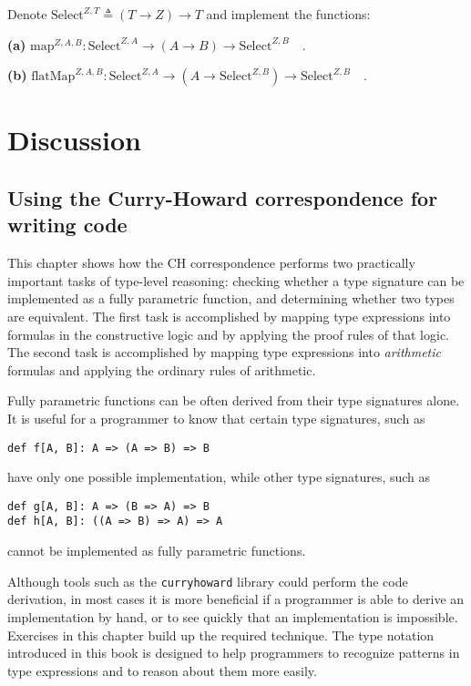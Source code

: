Denote $\text{Select}^{Z,T}\triangleq\left(T\rightarrow Z\right)\rightarrow T$
and implement the functions:

\textbf{(a)} $\text{map}^{Z,A,B}:\text{Select}^{Z,A}\rightarrow\left(A\rightarrow B\right)\rightarrow\text{Select}^{Z,B}\quad.$

\textbf{(b)} $\text{flatMap}^{Z,A,B}:\text{Select}^{Z,A}\rightarrow(A\rightarrow\text{Select}^{Z,B})\rightarrow\text{Select}^{Z,B}\quad.$

\section{Discussion}

\subsection{Using the Curry-Howard correspondence for writing code}

This chapter shows how the CH correspondence performs two practically
important tasks of type-level reasoning: checking whether a type signature
can be implemented as a fully parametric function, and determining
whether two types are equivalent. The first task is accomplished by
mapping type expressions into formulas in the constructive logic and
by applying the proof rules of that logic. The second task is accomplished
by mapping type expressions into \emph{arithmetic} formulas and applying
the ordinary rules of arithmetic.

Fully parametric functions can be often derived from their type signatures
alone. It is useful for a programmer to know that certain type signatures,
such as
\begin{lstlisting}
def f[A, B]: A => (A => B) => B
\end{lstlisting}
have only one possible implementation, while other type signatures,
such as
\begin{lstlisting}
def g[A, B]: A => (B => A) => B
def h[A, B]: ((A => B) => A) => A
\end{lstlisting}
cannot be implemented as fully parametric functions.

Although tools such as the \texttt{curryhoward} library could perform
the code derivation, in most cases it is more beneficial if a programmer
is able to derive an implementation by hand, or to see quickly that
an implementation is impossible. Exercises in this chapter build up
the required technique. The type notation introduced in this book
is designed to help programmers to recognize patterns in type expressions
and to reason about them more easily.

